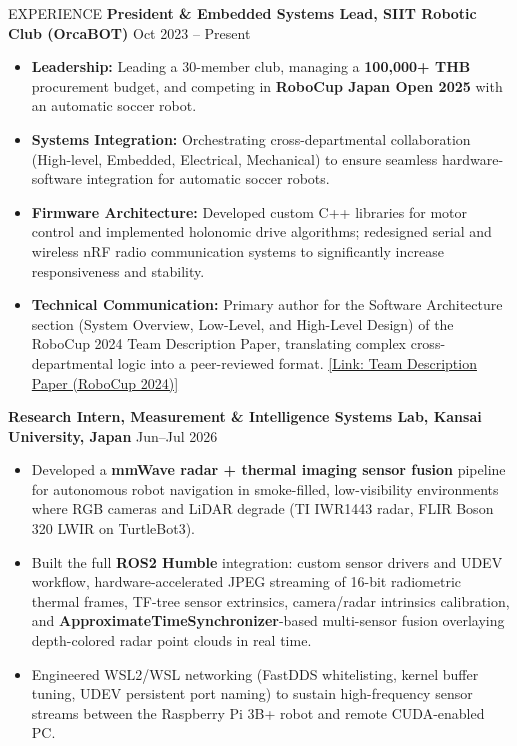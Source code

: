 \documentclass[11pt]{resume} %
\begin{document}
\vspace{-1 mm}
\begin{rSection}{EXPERIENCE}
    \textbf{President \& Embedded Systems Lead, SIIT Robotic Club (OrcaBOT)} \hfill {Oct 2023 – Present} 
 \begin{itemize}
    \item \textbf{Leadership:} Leading a 30-member club, managing a \textbf{100,000+ THB} procurement budget, and competing in \textbf{RoboCup Japan Open 2025} with an automatic soccer robot.
    \item \textbf{Systems Integration:} Orchestrating cross-departmental collaboration (High-level, Embedded, Electrical, Mechanical) to ensure seamless hardware-software integration for automatic soccer robots.
    \item \textbf{Firmware Architecture:} Developed custom C++ libraries for motor control and implemented holonomic drive algorithms; redesigned serial and wireless nRF radio communication systems to significantly increase responsiveness and stability.
    \item \textbf{Technical Communication:} Primary author for the Software Architecture section (System Overview, Low-Level, and High-Level Design) of the RoboCup 2024 Team Description Paper, translating complex cross-departmental logic into a peer-reviewed format. \href{https://ssl.robocup.org/wp-content/uploads/2024/04/2024_TDP_OrcaBOT.pdf}{[Link: Team Description Paper (RoboCup 2024)]}
    \end{itemize}
    \vspace{0.em}

    \textbf{Research Intern, Measurement \& Intelligence Systems Lab, Kansai University, Japan} \hfill {Jun--Jul 2026}
     \begin{itemize}
        \item Developed a \textbf{mmWave radar + thermal imaging sensor fusion} pipeline for autonomous robot navigation in smoke-filled, low-visibility environments where RGB cameras and LiDAR degrade (TI IWR1443 radar, FLIR Boson 320 LWIR on TurtleBot3).
        \item Built the full \textbf{ROS2 Humble} integration: custom sensor drivers and UDEV workflow, hardware-accelerated JPEG streaming of 16-bit radiometric thermal frames, TF-tree sensor extrinsics, camera/radar intrinsics calibration, and \textbf{ApproximateTimeSynchronizer}-based multi-sensor fusion overlaying depth-colored radar point clouds in real time.
        \item Engineered WSL2/WSL networking (FastDDS whitelisting, kernel buffer tuning, UDEV persistent port naming) to sustain high-frequency sensor streams between the Raspberry Pi 3B+ robot and remote CUDA-enabled PC.
    \end{itemize}
    \vspace{0.em}


\end{rSection}
\end{document}
